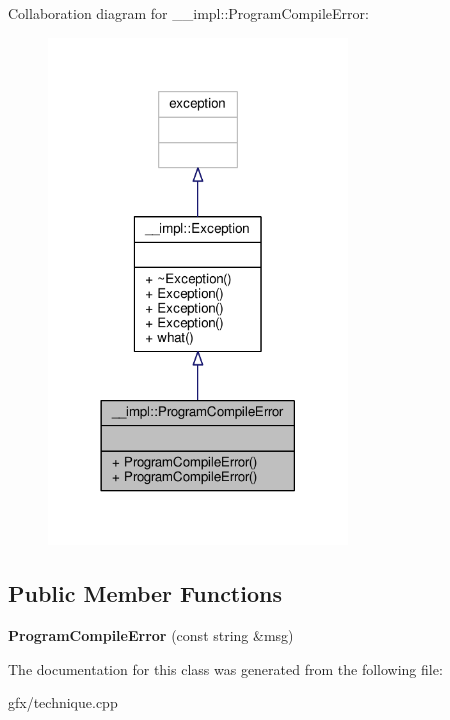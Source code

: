 Collaboration diagram for \+\_\+\+\_\+impl\+:\+:Program\+Compile\+Error\+:
\nopagebreak
\begin{figure}[H]
\begin{center}
\leavevmode
\includegraphics[width=225pt]{d3/de2/class____impl_1_1ProgramCompileError__coll__graph}
\end{center}
\end{figure}
\subsection*{Public Member Functions}
\begin{DoxyCompactItemize}
\item 
{\bfseries Program\+Compile\+Error} (const string \&msg)\hypertarget{class____impl_1_1ProgramCompileError_a2384e65ad1bb6d786e3566480cee9556}{}\label{class____impl_1_1ProgramCompileError_a2384e65ad1bb6d786e3566480cee9556}

\end{DoxyCompactItemize}


The documentation for this class was generated from the following file\+:\begin{DoxyCompactItemize}
\item 
gfx/technique.\+cpp\end{DoxyCompactItemize}
